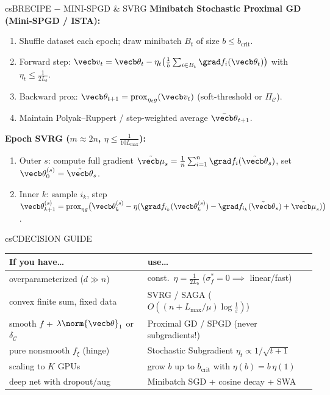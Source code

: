 \documentclass[../../../../master.tex]{subfiles}
\begin{document}
\begin{cscolumns}
\begin{cscard}{csB}{RECIPE $-$ MINI-SPGD \& SVRG}
  \footnotesize
  \textbf{Minibatch Stochastic Proximal GD (Mini-SPGD / ISTA):}
  \begin{enumerate}[leftmargin=1.2em, itemsep=0.5pt, topsep=1pt, parsep=0pt]
    \item Shuffle dataset each epoch; draw minibatch $B_t$ of size $b\le b_{\mathrm{crit}}$.
    \item Forward step: $\vecb v_t=\vecb\theta_t-\eta_t\bigl(\frac{1}{b}\sum_{i\in B_t}\grad f_i(\vecb\theta_t)\bigr)$ with $\eta_t\le\frac{1}{2L_b}$.
    \item Backward prox: $\vecb\theta_{t+1}=\operatorname{prox}_{\eta_t g}(\vecb v_t)$ (soft-threshold or $\Pi_{\mathcal C}$).
    \item Maintain Polyak--Ruppert / step-weighted average $\bar{\vecb\theta}_{t+1}$.
  \end{enumerate}
  \vspace{1pt}
  \textbf{Epoch SVRG ($m\approx 2n$, $\eta\le\frac{1}{10L_{\max}}$):}
  \begin{enumerate}[leftmargin=1.2em, itemsep=0.5pt, topsep=1pt, parsep=0pt]
    \item Outer $s$: compute full gradient $\tilde{\vecb\mu}_s=\frac{1}{n}\sum_{i=1}^n\grad f_i(\tilde{\vecb\theta}_s)$, set $\vecb\theta_0^{(s)}=\tilde{\vecb\theta}_s$.
    \item Inner $k$: sample $i_k$, step $\vecb\theta_{k+1}^{(s)}=\operatorname{prox}_{\eta g}\bigl(\vecb\theta_k^{(s)}-\eta(\grad f_{i_k}(\vecb\theta_k^{(s)})-\grad f_{i_k}(\tilde{\vecb\theta}_s)+\tilde{\vecb\mu}_s)\bigr)$.
  \end{enumerate}
\end{cscard}
\columnbreak

\begin{cscard}{csC}{DECISION GUIDE}
  \renewcommand{\arraystretch}{1.14}\footnotesize
  \begin{tabular}{@{}>{\raggedright\arraybackslash}p{3.1cm}>{\raggedright\arraybackslash}p{4.6cm}@{}}
    \textbf{If you have\ldots} & \textbf{use\ldots}\\ \hline
    overparameterized ($d\gg n$) & const.\ $\eta=\frac{1}{2L_b}$ ($\sigma_f^*=0\implies$ linear/fast)\\
    convex finite sum, fixed data & SVRG / SAGA ($O((n+L_{\max}/\mu)\log\frac{1}{\varepsilon})$)\\
    smooth $f$ + $\lambda\norm{\vecb\theta}_1$ or $\delta_{\mathcal C}$ & Proximal GD / SPGD (never subgradients!)\\
    pure nonsmooth $f_\xi$ (hinge) & Stochastic Subgradient $\eta_t\propto 1/\sqrt{t+1}$\\
    scaling to $K$ GPUs & grow $b$ up to $b_{\mathrm{crit}}$ with $\eta(b)=b\,\eta(1)$\\
    deep net with dropout/aug & Minibatch SGD + cosine decay + SWA\\
  \end{tabular}
\end{cscard}


\end{cscolumns}
\end{document}
